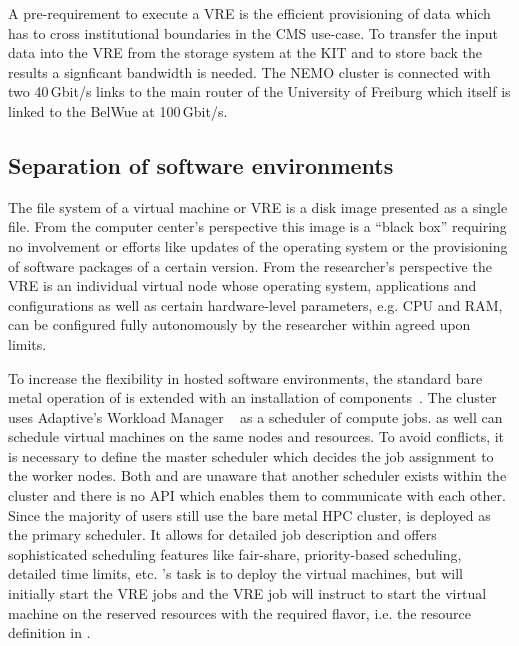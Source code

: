 A pre-requirement to execute a VRE is the efficient
provisioning of data which has to cross institutional boundaries in the CMS use-case.
To transfer the input data into the VRE from the storage system at
the KIT and to store back the results a signficant bandwidth is needed. The
NEMO cluster is connected with two 40\,Gbit/s links to the main router of the
University of Freiburg which itself is linked to the BelWue at
100\,Gbit/s.

\subsection{Separation of software environments}

The file system of a virtual machine or VRE is a
disk image presented as a single file. From the computer center's perspective
this image is a ``black box'' requiring no involvement or efforts like
updates of the operating system or the provisioning of software packages of a
certain version. From the researcher's perspective the VRE is an individual
virtual node whose operating system, applications and configurations
as well as certain hardware-level parameters, e.g. CPU and RAM, can be
configured fully autonomously by the researcher within agreed upon limits.


To increase the flexibility in hosted software environments, the standard bare metal
operation of \NEMO is extended with an installation of \Openstack
components~\cite{hpc-symp:2016}.
The \NEMO cluster uses Adaptive's Workload Manager \Moab~\cite{Moab} as a
scheduler of compute jobs.
\Openstack as well can schedule virtual machines on the same nodes and
resources.
To avoid conflicts, it is necessary to define the master scheduler
which decides the job assignment to the worker nodes.
Both \Moab and \Openstack are
unaware that another scheduler exists within the cluster and there is
no API which enables them to  communicate with each other. Since the majority of users still use the
bare metal HPC cluster, \Moab is deployed as the primary scheduler. It allows for
detailed job description and offers sophisticated scheduling features like
fair-share, priority-based scheduling, detailed time limits,
etc. \Openstack 's task is to deploy the virtual machines, but \Moab will initially start the VRE
jobs and the VRE job will instruct \Openstack to start the virtual machine on the
reserved resources with the required flavor, i.e. the resource definition in \Openstack.

